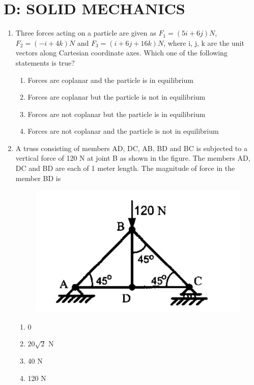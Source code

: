 \documentclass[a4paper,10pt]{article}
\begin{document}
\section*{D: SOLID MECHANICS}
\begin{enumerate}
\item Three forces acting on a particle are given as
$F_1 = (5i+6j)N$, $F_2 = (-i +4k)N$ and $F_3 = (i+6j+16k)N$, where i, j, k are the unit vectors along Cartesian coordinate axes. Which one of the following statements is true?
\hfill{}

\begin{enumerate}
\item Forces are coplanar and the particle is in equilibrium
\item Forces are coplanar but the particle is not in equilibrium
\item Forces are not coplanar but the particle is in equilibrium
\item Forces are not coplanar and the particle is not in equilibrium
\end{enumerate}

\item A truss consisting of members AD, DC, AB, BD and BC is subjected to a vertical force of 120 N at joint B as shown in the figure. The members AD, DC and BD are each of 1 meter length. The magnitude of force in the member BD is
\begin{figure}[H]
    \centering
    \includegraphics[width=0.4\columnwidth]{Dq2.png}
    \caption*{}
    \label{fig:q2_solid}
\end{figure}
\hfill{}

\begin{multicols}{4}
\begin{enumerate}
\item 0
\item $20\sqrt{2}$ N
\item 40 N
\item 120 N
\end{enumerate}
\end{multicols}


\end{enumerate}
\end{document}
